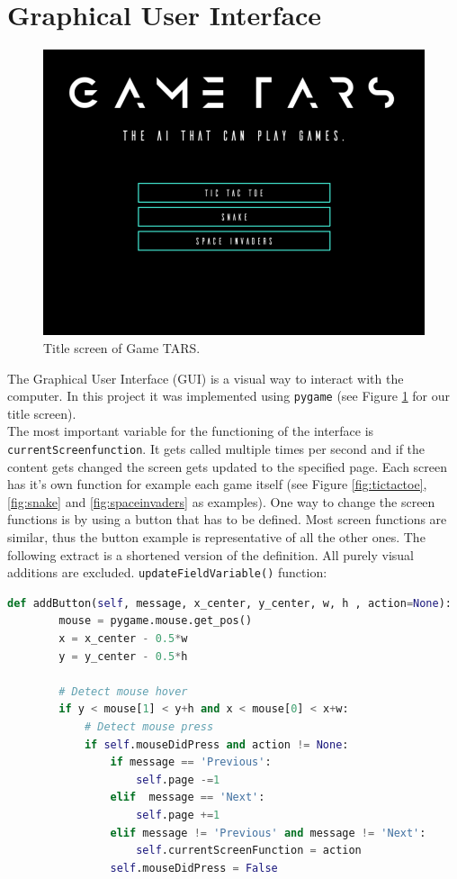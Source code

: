\documentclass[12pt]{article}
\begin{document}
\section{Graphical User Interface}\label{GUI}
\begin{figure}[ht]
    \centering
    \includegraphics[width=0.9\linewidth]{pictures/TitleScreen.png}
    \caption{Title screen of Game TARS.}
    \label{fig:titlescreen}
\end{figure}
The Graphical User Interface (GUI) is a visual way to interact with the computer. In this project it was implemented using \lstinline{pygame} (see Figure \ref{fig:titlescreen} for our title screen). \\
The most important variable for the functioning of the interface is \lstinline{currentScreenfunction}. It gets called multiple times per second and if the content gets changed the screen gets updated to the specified page. Each screen has it's own function for example each game itself (see Figure \ref{fig:tictactoe}, \ref{fig:snake} and \ref{fig:spaceinvaders} as examples). One way to change the screen functions is by using a button that has to be defined. Most screen functions are similar, thus the button example is representative of all the other ones. The following extract is a shortened version of the definition. All purely visual additions are excluded.
\lstinline{updateFieldVariable()} function:
\begin{lstlisting}[language=Python, caption=Example - Definition of the button function]
    def addButton(self, message, x_center, y_center, w, h , action=None):
        mouse = pygame.mouse.get_pos()
        x = x_center - 0.5*w
        y = y_center - 0.5*h

        # Detect mouse hover
        if y < mouse[1] < y+h and x < mouse[0] < x+w:
            # Detect mouse press
            if self.mouseDidPress and action != None:
                if message == 'Previous': 
                    self.page -=1
                elif  message == 'Next':
                    self.page +=1
                elif message != 'Previous' and message != 'Next':
                    self.currentScreenFunction = action
                self.mouseDidPress = False
\end{lstlisting}
\end{document}
